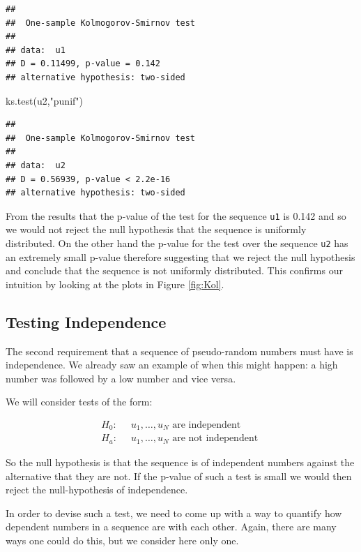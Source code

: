 \documentclass[
]{book}
\newenvironment{Shaded}{\begin{snugshade}}{\end{snugshade}}
\newcommand{\FunctionTok}[1]{\textcolor[rgb]{0.00,0.00,0.00}{#1}}
\newcommand{\NormalTok}[1]{#1}
\newcommand{\StringTok}[1]{\textcolor[rgb]{0.31,0.60,0.02}{#1}}
\theoremstyle{definition}
\theoremstyle{definition}
\theoremstyle{definition}
\theoremstyle{definition}
\theoremstyle{remark}
\begin{document}
\begin{verbatim}
## 
##  One-sample Kolmogorov-Smirnov test
## 
## data:  u1
## D = 0.11499, p-value = 0.142
## alternative hypothesis: two-sided
\end{verbatim}

\begin{Shaded}
\begin{Highlighting}[]
\FunctionTok{ks.test}\NormalTok{(u2,}\StringTok{"punif"}\NormalTok{)}
\end{Highlighting}
\end{Shaded}

\begin{verbatim}
## 
##  One-sample Kolmogorov-Smirnov test
## 
## data:  u2
## D = 0.56939, p-value < 2.2e-16
## alternative hypothesis: two-sided
\end{verbatim}

From the results that the p-value of the test for the sequence \texttt{u1} is 0.142 and so we would not reject the null hypothesis that the sequence is uniformly distributed. On the other hand the p-value for the test over the sequence \texttt{u2} has an extremely small p-value therefore suggesting that we reject the null hypothesis and conclude that the sequence is not uniformly distributed. This confirms our intuition by looking at the plots in Figure \ref{fig:Kol}.

\hypertarget{testing-independence}{%
\subsection{Testing Independence}\label{testing-independence}}

The second requirement that a sequence of pseudo-random numbers must have is independence. We already saw an example of when this might happen: a high number was followed by a low number and vice versa.

We will consider tests of the form:

\begin{align*}
H_0: & \;\;u_1,\dots,u_N \mbox{ are independent }\\
H_a: & \;\;u_1,\dots,u_N \mbox{ are not independent }
\end{align*}

So the null hypothesis is that the sequence is of independent numbers against the alternative that they are not. If the p-value of such a test is small we would then reject the null-hypothesis of independence.

In order to devise such a test, we need to come up with a way to quantify how dependent numbers in a sequence are with each other. Again, there are many ways one could do this, but we consider here only one.
\end{document}
